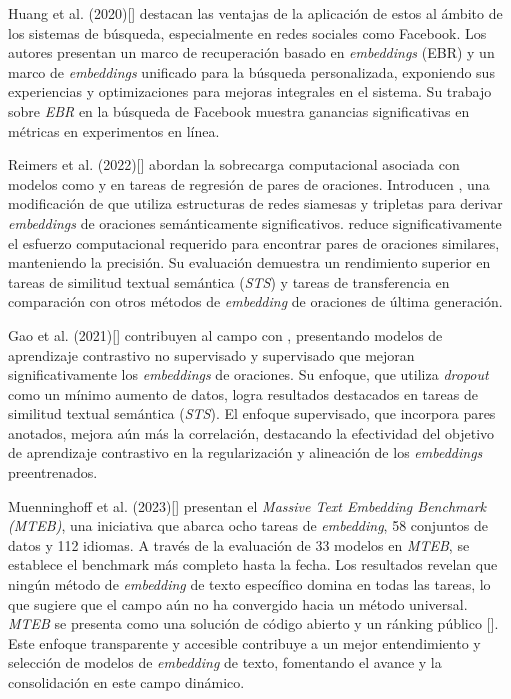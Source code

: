     Huang et al. (2020)[\cite{Huang_2020}] destacan las ventajas de la aplicación de estos al ámbito de los sistemas de búsqueda, especialmente en redes sociales como Facebook. Los autores presentan un marco de recuperación basado en \emph{embeddings} (EBR) y un marco de \emph{embeddings} unificado para la búsqueda personalizada, exponiendo sus experiencias y optimizaciones para mejoras integrales en el sistema. Su trabajo sobre \emph{EBR} en la búsqueda de Facebook muestra ganancias significativas en métricas en experimentos en línea.

    Reimers et al. (2022)[\cite{reimers2019sentencebert}] abordan la sobrecarga computacional asociada con modelos como  y  en tareas de regresión de pares de oraciones. Introducen , una modificación de  que utiliza estructuras de redes siamesas y tripletas para derivar \emph{embeddings} de oraciones semánticamente significativos.  reduce significativamente el esfuerzo computacional requerido para encontrar pares de oraciones similares, manteniendo la precisión. Su evaluación demuestra un rendimiento superior en tareas de similitud textual semántica (\emph{STS}) y tareas de transferencia en comparación con otros métodos de \emph{embedding} de oraciones de última generación.

    Gao et al. (2021)[\cite{gao2022simcse}] contribuyen al campo con , presentando modelos de aprendizaje contrastivo no supervisado y supervisado que mejoran significativamente los \emph{embeddings} de oraciones. Su enfoque, que utiliza \emph{dropout} como un mínimo aumento de datos, logra resultados destacados en tareas de similitud textual semántica (\emph{STS}). El enfoque supervisado, que incorpora pares anotados, mejora aún más la correlación, destacando la efectividad del objetivo de aprendizaje contrastivo en la regularización y alineación de los \emph{embeddings} preentrenados.

    Muenninghoff et al. (2023)[\cite{muennighoff2023mteb}] presentan el \emph{Massive Text Embedding Benchmark (MTEB)}, una iniciativa que abarca ocho tareas de \emph{embedding}, 58 conjuntos de datos y 112 idiomas. A través de la evaluación de 33 modelos en \emph{MTEB}, se establece el benchmark más completo hasta la fecha. Los resultados revelan que ningún método de \emph{embedding} de texto específico domina en todas las tareas, lo que sugiere que el campo aún no ha convergido hacia un método universal. \emph{MTEB} se presenta como una solución de código abierto y un ránking público [\cite{leaderboard}]. Este enfoque transparente y accesible contribuye a un mejor entendimiento y selección de modelos de \emph{embedding} de texto, fomentando el avance y la consolidación en este campo dinámico.

